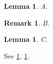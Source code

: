 \documentclass{article}
\newtheorem{lem}[thm]{Lemma}
\newtheorem*{rmk}[thm]{Remark}
\begin{document}
\begin{lem}\label{a} A. \end{lem}
\begin{rmk} B. \end{rmk}
\begin{lem}\label{c} C. \end{lem}
See \ref{a}, \ref{c}.
\end{document}

